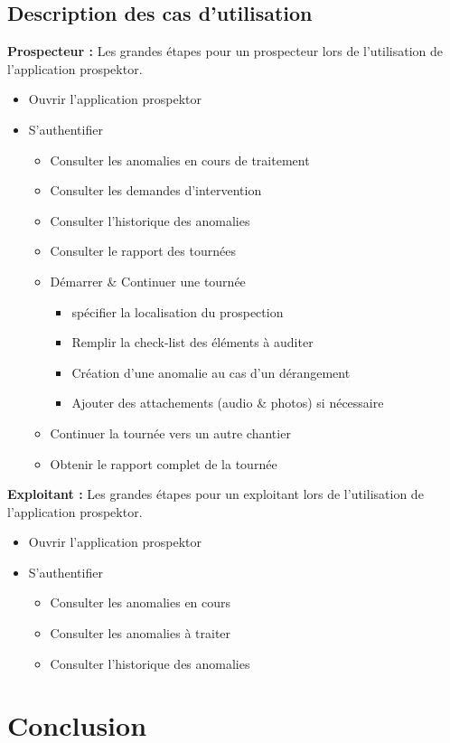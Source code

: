 \subsection{Description des cas d'utilisation}
\textbf{Prospecteur :} Les grandes \'etapes pour un prospecteur lors de l'utilisation de l'application prospektor.
\begin{itemize}
  \item Ouvrir l'application prospektor
  \item S'authentifier
  \begin{itemize}
    \item Consulter les anomalies en cours de traitement
    \item Consulter les demandes d'intervention
    \item Consulter l'historique des anomalies
    \item Consulter le rapport des tourn\'ees
    \item D\'emarrer \& Continuer une tourn\'ee
    \begin{itemize}
      \item sp\'ecifier la localisation du prospection
      \item Remplir la check-list des \'el\'ements \`a auditer
      \item Cr\'eation d'une anomalie au cas d'un d\'erangement
      \item Ajouter des attachements (audio \& photos) si n\'ecessaire
    \end{itemize}
    \item Continuer la tourn\'ee vers un autre chantier
    \item Obtenir le rapport complet de la tourn\'ee 
  \end{itemize}
\end{itemize}

\textbf{Exploitant :} Les grandes \'etapes pour un exploitant lors de l'utilisation de l'application prospektor.
\begin{itemize}
  \item Ouvrir l'application prospektor
  \item S'authentifier
  \begin{itemize}
    \item Consulter les anomalies en cours
    \item Consulter les anomalies \`a traiter
    \item Consulter l'historique des anomalies
  \end{itemize}
\end{itemize}

    


    



\section{Conclusion}